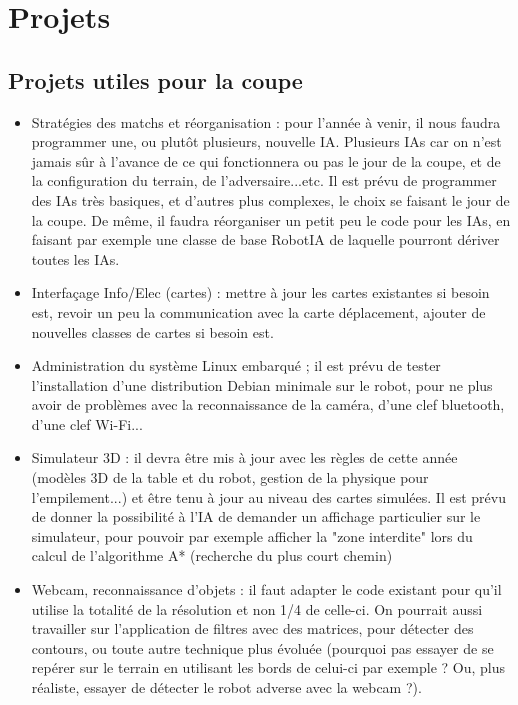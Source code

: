
\section{Projets}

\subsection{Projets utiles pour la coupe}
\begin{itemize}
\item Stratégies des matchs et réorganisation : pour l'année à venir, il nous faudra programmer une, ou plutôt plusieurs, nouvelle IA. Plusieurs IAs car on n'est jamais sûr à l'avance de ce qui fonctionnera ou pas le jour de la coupe, et de la configuration du terrain, de l'adversaire...etc. Il est prévu de programmer des IAs très basiques, et d'autres plus complexes, le choix se faisant le jour de la coupe. De même, il faudra réorganiser un petit peu le code pour les IAs, en faisant par exemple une classe de base RobotIA de laquelle pourront dériver toutes les IAs.\\
\item Interfaçage Info/Elec (cartes) : mettre à jour les cartes existantes si besoin est, revoir un peu la communication avec la carte déplacement, ajouter de nouvelles classes de cartes si besoin est.\\
\item Administration du système Linux embarqué ; il est prévu de tester l'installation d'une distribution Debian minimale sur le robot, pour ne plus avoir de problèmes avec la reconnaissance de la caméra, d'une clef bluetooth, d'une clef Wi-Fi...\\
\item Simulateur 3D : il devra être mis à jour avec les règles de cette année (modèles 3D de la table et du robot, gestion de la physique pour l'empilement...) et être tenu à jour au niveau des cartes simulées. Il est prévu de donner la possibilité à l'IA de demander un affichage particulier sur le simulateur, pour pouvoir par exemple afficher la "zone interdite" lors du calcul de l'algorithme A* (recherche du plus court chemin)\\
\item Webcam, reconnaissance d'objets : il faut adapter le code existant pour qu'il utilise la totalité de la résolution et non 1/4 de celle-ci. On pourrait aussi travailler sur l'application de filtres avec des matrices, pour détecter des contours, ou toute autre technique plus évoluée (pourquoi pas essayer de se repérer sur le terrain en utilisant les bords de celui-ci par exemple ? Ou, plus réaliste, essayer de détecter le robot adverse avec la webcam ?).\\

\end{itemize}
